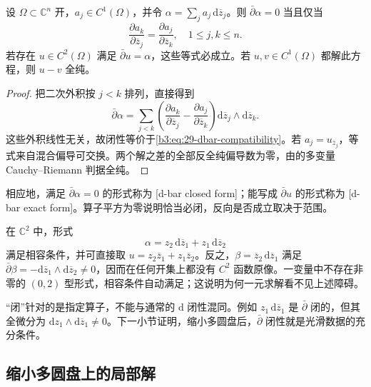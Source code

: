 \begin{proposition}\label{b3:prop:29-dbar-compatibility}
设 \(\Omega\subset\mathbb C^n\) 开，\(a_j\in C^1(\Omega)\)，并令
\(\alpha=\sum_j a_j\,\mathrm d\overline z_j\)。则 \(\bar\partial\alpha=0\) 当且仅当
\begin{equation}\label{b3:eq:29-dbar-compatibility}
 \frac{\partial a_k}{\partial\overline z_j}
 =\frac{\partial a_j}{\partial\overline z_k},\quad 1\le j,k\le n.
\end{equation}
若存在 \(u\in C^2(\Omega)\) 满足 \(\bar\partial u=\alpha\)，这些等式必成立。若 \(u,v\in C^1(\Omega)\) 都解此方程，则 \(u-v\) 全纯。
\end{proposition}
\begin{proof}
把二次外积按 \(j<k\) 排列，直接得到
\[
 \bar\partial\alpha
 =\sum_{j<k}\left(
   \frac{\partial a_k}{\partial\overline z_j}
  -\frac{\partial a_j}{\partial\overline z_k}\right)
   \mathrm d\overline z_j\wedge\mathrm d\overline z_k.
\]
这些外积线性无关，故闭性等价于\eqref{b3:eq:29-dbar-compatibility}。若 \(a_j=u_{\overline z_j}\)，等式来自混合偏导可交换。两个解之差的全部反全纯偏导数为零，由的多变量 Cauchy--Riemann 判据全纯。
\end{proof}

相应地，满足 \(\bar\partial\alpha=0\) 的形式称为 [d-bar closed form]；能写成 \(\bar\partial u\) 的形式称为 [d-bar exact form]。算子平方为零说明恰当必闭，反向是否成立取决于范围。

在 \(\mathbb C^2\) 中，形式
\[
 \alpha=z_2\,\mathrm d\overline z_1+z_1\,\mathrm d\overline z_2
\]
满足相容条件，并可直接取 \(u=z_2\overline z_1+z_1\overline z_2\)。反之，\(\beta=\overline z_2\,\mathrm d\overline z_1\) 满足
\(\bar\partial\beta=-\mathrm d\overline z_1\wedge\mathrm d\overline z_2\ne0\)，因而在任何开集上都没有 \(C^2\) 函数原像。一变量中不存在非零的 \((0,2)\) 型形式，相容条件自动满足；这说明为何一元求解看不见上述障碍。

\ProseParagraphBreak

“闭”针对的是指定算子，不能与通常的 \(\mathrm d\) 闭性混同。例如 \(z_1\,\mathrm d\overline z_1\) 是 \(\bar\partial\) 闭的，但其全微分为 \(\mathrm dz_1\wedge\mathrm d\overline z_1\ne0\)。下一小节证明，缩小多圆盘后，\(\bar\partial\) 闭性就是光滑数据的充分条件。

\subsection{缩小多圆盘上的局部解}
\label{b3:subsec:290504}

